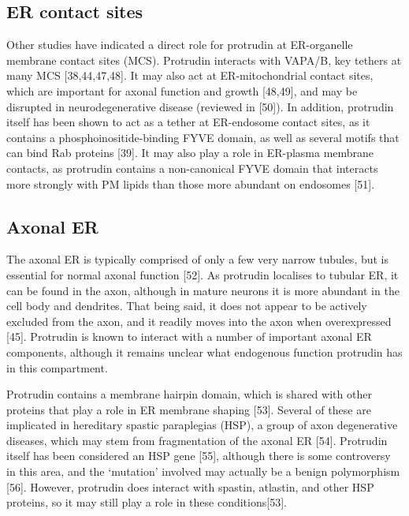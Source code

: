 \documentclass[
  12pt,
  a4paper,
]{book}
\begin{document}
\hypertarget{er-contact-sites}{%
\subsection{ER contact sites}\label{er-contact-sites}}

Other studies have indicated a direct role for protrudin at ER-organelle membrane contact sites (MCS). Protrudin interacts with VAPA/B, key tethers at many MCS {[}38,44,47,48{]}. It may also act at ER-mitochondrial contact sites, which are important for axonal function and growth {[}48,49{]}, and may be disrupted in neurodegenerative disease (reviewed in {[}50{]}). In addition, protrudin itself has been shown to act as a tether at ER-endosome contact sites, as it contains a phosphoinositide-binding FYVE domain, as well as several motifs that can bind Rab proteins {[}39{]}. It may also play a role in ER-plasma membrane contacts, as protrudin contains a non-canonical FYVE domain that interacts more strongly with PM lipids than those more abundant on endosomes {[}51{]}.

\hypertarget{intro-ptdn-axonalER}{%
\subsection{Axonal ER}\label{intro-ptdn-axonalER}}

The axonal ER is typically comprised of only a few very narrow tubules, but is essential for normal axonal function {[}52{]}. As protrudin localises to tubular ER, it can be found in the axon, although in mature neurons it is more abundant in the cell body and dendrites. That being said, it does not appear to be actively excluded from the axon, and it readily moves into the axon when overexpressed {[}45{]}. Protrudin is known to interact with a number of important axonal ER components, although it remains unclear what endogenous function protrudin has in this compartment.

Protrudin contains a membrane hairpin domain, which is shared with other proteins that play a role in ER membrane shaping {[}53{]}. Several of these are implicated in hereditary spastic paraplegias (HSP), a group of axon degenerative diseases, which may stem from fragmentation of the axonal ER {[}54{]}. Protrudin itself has been considered an HSP gene {[}55{]}, although there is some controversy in this area, and the `mutation' involved may actually be a benign polymorphism {[}56{]}. However, protrudin does interact with spastin, atlastin, and other HSP proteins, so it may still play a role in these conditions{[}53{]}.
\end{document}
